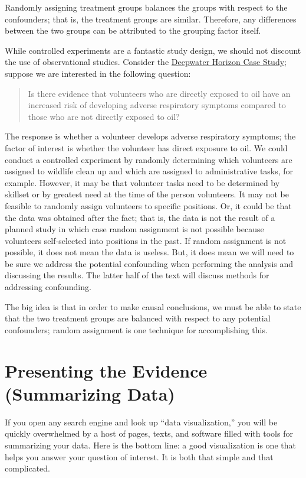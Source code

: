 \documentclass[]{book}
\theoremstyle{definition}
\theoremstyle{definition}
\theoremstyle{remark}
\let\BeginKnitrBlock\begin \let\EndKnitrBlock\end
\begin{document}
\BeginKnitrBlock{rmdkeyidea}
Randomly assigning treatment groups balances the groups with respect to
the confounders; that is, the treatment groups are similar. Therefore,
any differences between the two groups can be attributed to the grouping
factor itself.
\EndKnitrBlock{rmdkeyidea}

While controlled experiments are a fantastic study design, we should not
discount the use of observational studies. Consider the
\protect\hyperlink{CaseDeepwater}{Deepwater Horizon Case Study}; suppose
we are interested in the following question:

\begin{quote}
Is there evidence that volunteers who are directly exposed to oil have
an increased risk of developing adverse respiratory symptoms compared to
those who are not directly exposed to oil?
\end{quote}

The response is whether a volunteer develops adverse respiratory
symptoms; the factor of interest is whether the volunteer has direct
exposure to oil. We could conduct a controlled experiment by randomly
determining which volunteers are assigned to wildlife clean up and which
are assigned to administrative tasks, for example. However, it may be
that volunteer tasks need to be determined by skillset or by greatest
need at the time of the person volunteers. It may not be feasible to
randomly assign volunteers to specific positions. Or, it could be that
the data was obtained after the fact; that is, the data is not the
result of a planned study in which case random assignment is not
possible because volunteers self-selected into positions in the past. If
random assignment is not possible, it does not mean the data is useless.
But, it does mean we will need to be sure we address the potential
confounding when performing the analysis and discussing the results. The
latter half of the text will discuss methods for addressing confounding.

The big idea is that in order to make causal conclusions, we must be
able to state that the two treatment groups are balanced with respect to
any potential confounders; random assignment is one technique for
accomplishing this.

\chapter{Presenting the Evidence (Summarizing Data)}\label{Summaries}

If you open any search engine and look up ``data visualization,'' you
will be quickly overwhelmed by a host of pages, texts, and software
filled with tools for summarizing your data. Here is the bottom line: a
good visualization is one that helps you answer your question of
interest. It is both that simple and that complicated.
\end{document}
